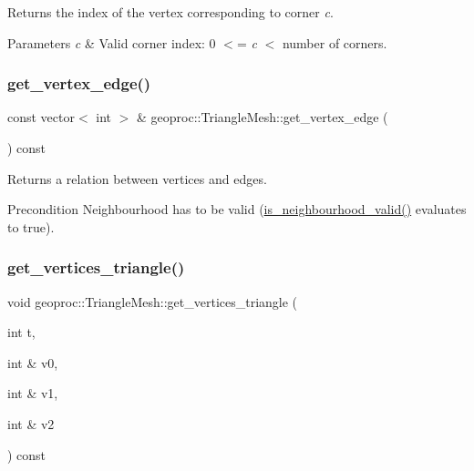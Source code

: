 Returns the index of the vertex corresponding to corner {\itshape c}. 


\begin{DoxyParams}{Parameters}
{\em c} & Valid corner index\+: 0 $<$= {\itshape c} $<$ number of corners. \\
\hline
\end{DoxyParams}
\mbox{\label{classgeoproc_1_1TriangleMesh_ae73a760e61250eb2f474b8ab03a1e2ab}} 
\subsubsection{\texorpdfstring{get\+\_\+vertex\+\_\+edge()}{get\_vertex\_edge()}}
{\footnotesize\ttfamily const vector$<$ int $>$ \& geoproc\+::\+Triangle\+Mesh\+::get\+\_\+vertex\+\_\+edge (\begin{DoxyParamCaption}{ }\end{DoxyParamCaption}) const}



Returns a relation between vertices and edges. 

\begin{DoxyPrecond}{Precondition}
Neighbourhood has to be valid (\hyperlink{classgeoproc_1_1TriangleMesh_aa6f95b95709a72a14a15638bfeeed3f9}{is\+\_\+neighbourhood\+\_\+valid()} evaluates to true). 
\end{DoxyPrecond}
\mbox{\label{classgeoproc_1_1TriangleMesh_aab448f6f589f4c329b4daca635d9d865}} 
\subsubsection{\texorpdfstring{get\+\_\+vertices\+\_\+triangle()}{get\_vertices\_triangle()}\hspace{0.1cm}{\footnotesize\ttfamily [1/2]}}
{\footnotesize\ttfamily void geoproc\+::\+Triangle\+Mesh\+::get\+\_\+vertices\+\_\+triangle (\begin{DoxyParamCaption}\item[{int}]{t,  }\item[{int \&}]{v0,  }\item[{int \&}]{v1,  }\item[{int \&}]{v2 }\end{DoxyParamCaption}) const}



